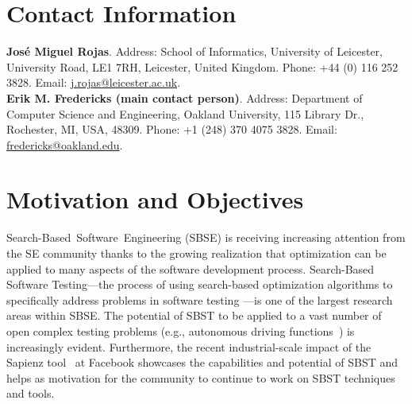 \documentclass[sigconf,review]{acmart}
\begin{document}
\maketitle



\section{Contact Information}

\noindent \textbf{Jos\'e Miguel Rojas}. Address:
School of Informatics, University of Leicester, University Road,
LE1 7RH, Leicester, United Kingdom. Phone: +44 (0) 116 252
3828. Email: \url{j.rojas@leicester.ac.uk}.\\
\textbf{Erik M. Fredericks (main contact person)}. Address:
Department of Computer Science and Engineering, Oakland University, 115 Library Dr.,
Rochester, MI, USA, 48309. Phone: +1 (248) 370 4075
3828. Email: \url{fredericks@oakland.edu}.

\section{Motivation and Objectives}
\label{sec:themes}
  
Search-Based~Software~Engineering (SBSE) \cite{mhbj:manifesto} is
receiving increasing attention from the SE community thanks to the
growing realization that optimization can be applied to many aspects
of the software development process.  Search-Based Software
Testing---the process of using search-based optimization algorithms to
specifically address problems in software testing
\cite{mcminn:survey}---is one of the largest research areas within
SBSE. The potential of SBST to be applied to a vast number of open
complex testing problems (e.g., autonomous driving
functions~\cite{Abdessalem2018}) is increasingly evident. Furthermore,
the recent industrial-scale impact of the Sapienz tool~\cite{Sapienz}
at Facebook showcases the capabilities and potential
of SBST and helps as motivation for the community to continue to work
on SBST techniques and tools.
\end{document}
